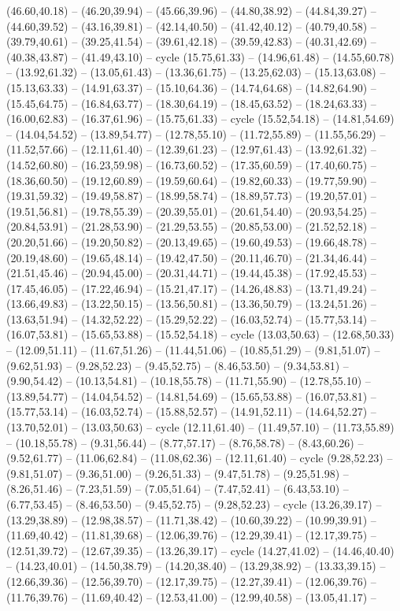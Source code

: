 {(46.60,40.18) -- (46.20,39.94) -- (45.66,39.96) -- (44.80,38.92) -- (44.84,39.27) -- (44.60,39.52) -- (43.16,39.81) -- (42.14,40.50) -- (41.42,40.12) -- (40.79,40.58) -- (39.79,40.61) -- (39.25,41.54) -- (39.61,42.18) -- (39.59,42.83) -- (40.31,42.69) -- (40.38,43.87) -- (41.49,43.10) -- cycle (15.75,61.33) -- (14.96,61.48) -- (14.55,60.78) -- (13.92,61.32) -- (13.05,61.43) -- (13.36,61.75) -- (13.25,62.03) -- (15.13,63.08) -- (15.13,63.33) -- (14.91,63.37) -- (15.10,64.36) -- (14.74,64.68) -- (14.82,64.90) -- (15.45,64.75) -- (16.84,63.77) -- (18.30,64.19) -- (18.45,63.52) -- (18.24,63.33) -- (16.00,62.83) -- (16.37,61.96) -- (15.75,61.33) -- cycle (15.52,54.18) -- (14.81,54.69) -- (14.04,54.52) -- (13.89,54.77) -- (12.78,55.10) -- (11.72,55.89) -- (11.55,56.29) -- (11.52,57.66) -- (12.11,61.40) -- (12.39,61.23) -- (12.97,61.43) -- (13.92,61.32) -- (14.52,60.80) -- (16.23,59.98) -- (16.73,60.52) -- (17.35,60.59) -- (17.40,60.75) -- (18.36,60.50) -- (19.12,60.89) -- (19.59,60.64) -- (19.82,60.33) -- (19.77,59.90) -- (19.31,59.32) -- (19.49,58.87) -- (18.99,58.74) -- (18.89,57.73) -- (19.20,57.01) -- (19.51,56.81) -- (19.78,55.39) -- (20.39,55.01) -- (20.61,54.40) -- (20.93,54.25) -- (20.84,53.91) -- (21.28,53.90) -- (21.29,53.55) -- (20.85,53.00) -- (21.52,52.18) -- (20.20,51.66) -- (19.20,50.82) -- (20.13,49.65) -- (19.60,49.53) -- (19.66,48.78) -- (20.19,48.60) -- (19.65,48.14) -- (19.42,47.50) -- (20.11,46.70) -- (21.34,46.44) -- (21.51,45.46) -- (20.94,45.00) -- (20.31,44.71) -- (19.44,45.38) -- (17.92,45.53) -- (17.45,46.05) -- (17.22,46.94) -- (15.21,47.17) -- (14.26,48.83) -- (13.71,49.24) -- (13.66,49.83) -- (13.22,50.15) -- (13.56,50.81) -- (13.36,50.79) -- (13.24,51.26) -- (13.63,51.94) -- (14.32,52.22) -- (15.29,52.22) -- (16.03,52.74) -- (15.77,53.14) -- (16.07,53.81) -- (15.65,53.88) -- (15.52,54.18) -- cycle (13.03,50.63) -- (12.68,50.33) -- (12.09,51.11) -- (11.67,51.26) -- (11.44,51.06) -- (10.85,51.29) -- (9.81,51.07) -- (9.62,51.93) -- (9.28,52.23) -- (9.45,52.75) -- (8.46,53.50) -- (9.34,53.81) -- (9.90,54.42) -- (10.13,54.81) -- (10.18,55.78) -- (11.71,55.90) -- (12.78,55.10) -- (13.89,54.77) -- (14.04,54.52) -- (14.81,54.69) -- (15.65,53.88) -- (16.07,53.81) -- (15.77,53.14) -- (16.03,52.74) -- (15.88,52.57) -- (14.91,52.11) -- (14.64,52.27) -- (13.70,52.01) -- (13.03,50.63) -- cycle (12.11,61.40) -- (11.49,57.10) -- (11.73,55.89) -- (10.18,55.78) -- (9.31,56.44) -- (8.77,57.17) -- (8.76,58.78) -- (8.43,60.26) -- (9.52,61.77) -- (11.06,62.84) -- (11.08,62.36) -- (12.11,61.40) -- cycle (9.28,52.23) -- (9.81,51.07) -- (9.36,51.00) -- (9.26,51.33) -- (9.47,51.78) -- (9.25,51.98) -- (8.26,51.46) -- (7.23,51.59) -- (7.05,51.64) -- (7.47,52.41) -- (6.43,53.10) -- (6.77,53.45) -- (8.46,53.50) -- (9.45,52.75) -- (9.28,52.23) -- cycle (13.26,39.17) -- (13.29,38.89) -- (12.98,38.57) -- (11.71,38.42) -- (10.60,39.22) -- (10.99,39.91) -- (11.69,40.42) -- (11.81,39.68) -- (12.06,39.76) -- (12.29,39.41) -- (12.17,39.75) -- (12.51,39.72) -- (12.67,39.35) -- (13.26,39.17) -- cycle (14.27,41.02) -- (14.46,40.40) -- (14.23,40.01) -- (14.50,38.79) -- (14.20,38.40) -- (13.29,38.92) -- (13.33,39.15) -- (12.66,39.36) -- (12.56,39.70) -- (12.17,39.75) -- (12.27,39.41) -- (12.06,39.76) -- (11.76,39.76) -- (11.69,40.42) -- (12.53,41.00) -- (12.99,40.58) -- (13.05,41.17) -- }
